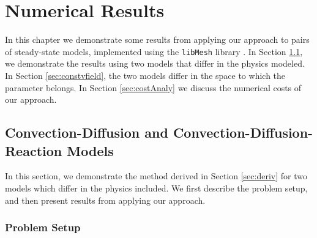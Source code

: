 \chapter{Numerical Results} \label{chap:results}

In this chapter we demonstrate some results from applying our approach to pairs of steady-state models, implemented using the \texttt{libMesh} library \cite{libMeshPaper}. In Section \ref{sec:cdvcdr}, we demonstrate the results using two models that differ in the physics modeled. In Section \ref{sec:constvfield}, the two models differ in the space to which the parameter belongs. In Section \ref{sec:costAnaly} we discuss the numerical costs of our approach.

\section{Convection-Diffusion and Convection-Diffusion-Reaction Models}  \label{sec:cdvcdr}

In this section, we demonstrate the method derived in Section \ref{sec:deriv} for two models which differ in the physics included. We first describe the problem setup, and then present results from applying our approach.

\subsection{Problem Setup} \label{sec:cdvcdrSetup}

